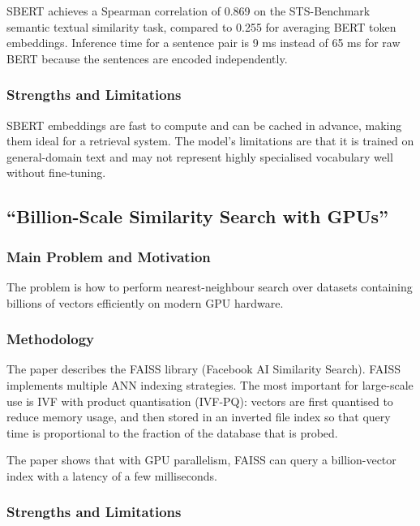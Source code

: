 \documentclass[12pt, a4paper]{report}
\begin{document}
SBERT achieves a Spearman correlation of 0.869 on the STS-Benchmark
semantic textual similarity task, compared to 0.255 for averaging BERT
token embeddings. Inference time for a sentence pair is 9 ms instead of
65 ms for raw BERT because the sentences are encoded independently.

\subsubsection{Strengths and Limitations}

SBERT embeddings are fast to compute and can be cached in advance, making
them ideal for a retrieval system. The model's limitations are that it is
trained on general-domain text and may not represent highly specialised
vocabulary well without fine-tuning.

\subsection{``Billion-Scale Similarity Search with GPUs'' \cite{johnson2019billion}}

\subsubsection{Main Problem and Motivation}

The problem is how to perform nearest-neighbour search over datasets
containing billions of vectors efficiently on modern GPU hardware.

\subsubsection{Methodology}

The paper describes the FAISS library (Facebook AI Similarity Search).
FAISS implements multiple ANN indexing strategies. The most important for
large-scale use is IVF with product quantisation (IVF-PQ): vectors are
first quantised to reduce memory usage, and then stored in an inverted
file index so that query time is proportional to the fraction of the
database that is probed.

The paper shows that with GPU parallelism, FAISS can query a billion-vector
index with a latency of a few milliseconds.

\subsubsection{Strengths and Limitations}
\end{document}
